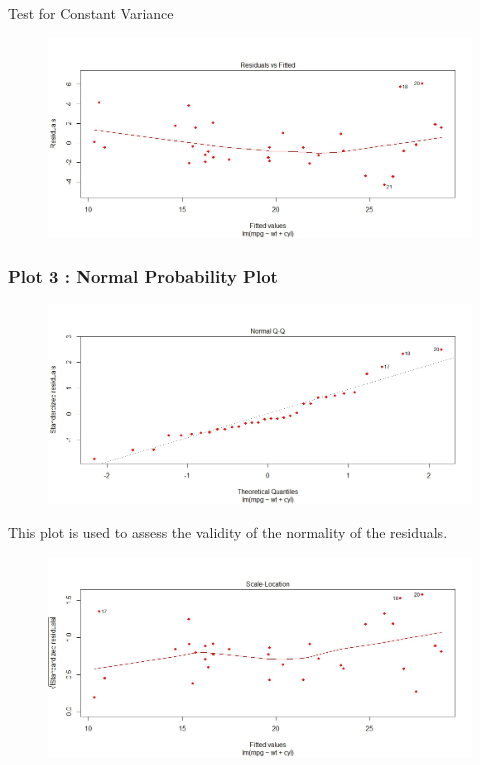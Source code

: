 \documentclass[residuals.tex]{subfiles}
\begin{document}
	
	Test for Constant Variance
	\begin{figure}[h!]
		\centering
		\includegraphics[width=0.95\linewidth]{./mtcarsDiagPlot1}
		
		\label{mtcarsDiagPlot1}
	\end{figure}
	
	\bigskip
	\subsubsection*{Plot 3 : Normal Probability Plot}
	\begin{figure}[h!]
		\centering
		\includegraphics[width=0.95\linewidth]{./mtcarsDiagPlot2}
		
		\label{mtcarsDiagPlot2}
	\end{figure}
	
	\bigskip
	This plot is used to assess the validity of the normality of the residuals.
	\begin{figure}[h!]
		\centering
		\includegraphics[width=0.95\linewidth]{./mtcarsDiagPlot3}
		
		\label{mtcarsDiagPlot3}
	\end{figure}
	
\end{document}
